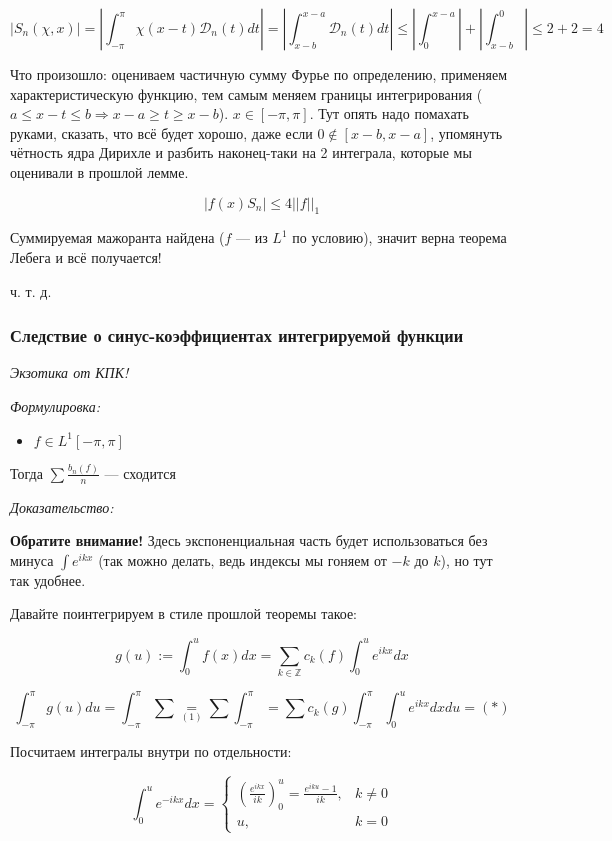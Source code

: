\documentclass{article}
\def\DD{\mathcal{D}}
\begin{document}
\[|S_n(\chi, x)| = \left| \int_{-\pi}^{\pi} \chi(x - t)\DD_n(t) dt\right| = \left|\int_{x - b}^{x - a} \DD_n(t) dt \right| \le \left| \int_{0}^{x - a} \right| + \left| \int_{x - b}^{0}\right| \le 2 + 2 = 4\]

Что произошло: оцениваем частичную сумму Фурье по определению, применяем характеристическую функцию, тем самым меняем границы интегрирования ($a \le x - t \le b \Rightarrow x - a \ge t \ge x - b$). $x \in [-\pi, \pi]$. Тут опять надо помахать руками, сказать, что всё будет хорошо, даже если $0 \notin [x - b, x - a]$, упомянуть чётность ядра Дирихле и разбить наконец-таки на 2 интеграла, которые мы оценивали в прошлой лемме.

\[|f(x)S_n| \le 4||f||_1\]

Суммируемая мажоранта найдена ($f$ --- из $L^1$ по условию), значит верна теорема Лебега и всё получается!

ч. т. д. 

\subsubsection{Следствие о синус-коэффициентах интегрируемой функции}

\textit{Экзотика от КПК!}

\textit{Формулировка:}

\begin{itemize}
    \item $f \in L^1[-\pi, \pi]$ 
\end{itemize}

Тогда $\sum \frac{b_n(f)}{n}$ --- сходится

\textit{Доказательство:}

\textbf{Обратите внимание!} Здесь экспоненциальная часть будет использоваться без минуса $\int e^{ikx}$ (так можно делать, ведь индексы мы гоняем от $-k$ до $k$), но тут так удобнее.

Давайте поинтегрируем в стиле прошлой теоремы такое:

\[g(u) := \int_{0}^{u} f(x)dx = \sum_{k \in \mathbb{Z}} c_k(f) \int_0^u e^{ikx} dx\]

\[\int_{-\pi}^{\pi} g(u) du = \int_{-\pi}^{\pi} \sum \underset{(1)}{=} \sum \int_{-\pi}^{\pi} = \sum c_k(g) \int_{-\pi}^{\pi} \int_{0}^{u} e^{ikx}dxdu = (*)\]

Посчитаем интегралы внутри по отдельности:

\[\int_{0}^{u} e^{-ikx}dx = \begin{cases}
    \left(\frac{e^{ikx}}{ik} \right)_0^{u} = \frac{e^{iku} - 1}{ik}, &k \neq 0\\
    u, &k = 0
\end{cases}\]
\end{document}
